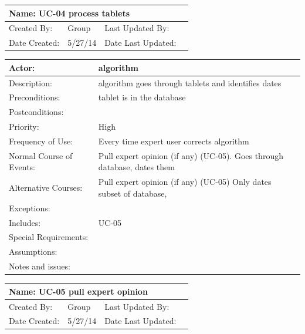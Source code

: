 \documentclass[11pt]{article}
\begin{document}
\begin{tabularx}{\textwidth}{|l|X|X|X|}
\hline
\multicolumn{4}{|l|}{Name: UC-04    process tablets}\\\hline
Created By: & Group & Last Updated By: &  \\\hline
Date Created: & 5/27/14 & Date Last Updated: &  \\\hline	
\end{tabularx}

\begin{tabularx}{\textwidth}{|l|X|}
\hline
Actor: & algorithm\\\hline
Description: & algorithm goes through tablets and identifies dates\\\hline
Preconditions: & tablet is in the database\\\hline
Postconditions: & \\\hline
Priority: & High\\\hline
Frequency of Use: & Every time expert user corrects algorithm\\\hline
Normal Course of Events: & Pull expert opinion (if any) (UC-05).
    Goes through database, dates them
\\\hline
Alternative Courses: & Pull expert opinion (if any) (UC-05)
    Only dates subset of database,\\\hline
Exceptions: & \\\hline
Includes: & UC-05\\\hline
Special Requirements: & \\\hline
Assumptions: & \\\hline
Notes and issues: & \\\hline
\end{tabularx}
\newpage

\begin{tabularx}{\textwidth}{|l|X|X|X|}
\hline
\multicolumn{4}{|l|}{Name: UC-05    pull expert opinion}\\\hline
Created By: & Group & Last Updated By: &  \\\hline
Date Created: & 5/27/14 & Date Last Updated: &  \\\hline	
\end{tabularx}
\end{document}
